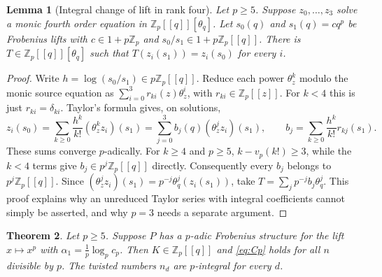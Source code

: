 \documentclass[11pt]{amsart}
\newtheorem{theorem}{Theorem}[section]
\newtheorem{lemma}[theorem]{Lemma}
\theoremstyle{definition}
\theoremstyle{remark}
\newcommand{\Z}{\mathbb{Z}}
\begin{document}
\begin{lemma}[Integral change of lift in rank four]\label{lem:transport}
Let $p\ge5$. Suppose $z_0,\ldots,z_3$ solve a monic fourth order equation in
$\Z_p[[q]][\theta_q]$. Let $s_0(q)$ and $s_1(q)=c q^p$ be Frobenius lifts with
$c\in1+p\Z_p$ and $s_0/s_1\in1+p\Z_p[[q]]$.
There is $T\in\Z_p[[q]][\theta_q]$ such that
$T(z_i(s_1))=z_i(s_0)$ for every $i$.
\end{lemma}
\begin{proof}
Write $h=\log(s_0/s_1)\in p\Z_p[[q]]$. Reduce each power $\theta_z^k$ modulo
the monic source equation as $\sum_{i=0}^3r_{ki}(z)\theta_z^i$, with
$r_{ki}\in\Z_p[[z]]$. For $k<4$ this is just $r_{ki}=\delta_{ki}$.
Taylor's formula gives, on solutions,
\[
z_i(s_0)=\sum_{k\ge0}\frac{h^k}{k!}(\theta_z^k z_i)(s_1)
=\sum_{j=0}^3b_j(q)(\theta_z^j z_i)(s_1),\qquad
b_j=\sum_{k\ge0}\frac{h^k}{k!}r_{kj}(s_1).
\]
These sums converge $p$-adically. For $k\ge4$ and $p\ge5$,
$k-v_p(k!)\ge3$, while the $k<4$ terms give $b_j\in p^j\Z_p[[q]]$ directly.
Consequently every $b_j$ belongs to $p^j\Z_p[[q]]$.
Since $(\theta_z^jz_i)(s_1)=p^{-j}\theta_q^j(z_i(s_1))$, take
$T=\sum_jp^{-j}b_j\theta_q^j$.
This proof explains why an unreduced Taylor series with integral coefficients
cannot simply be asserted, and why $p=3$ needs a separate argument.
\end{proof}

\begin{theorem}\label{thm:twisted}
Let $p\ge5$. Suppose $P$ has a $p$-adic Frobenius structure for the lift $x\mapsto x^p$
with $\alpha_1=\frac1p\log_p c_p$. Then $K\in\Z_p[[q]]$ and \eqref{eq:Cp} holds for all
$n$ divisible by $p$. The twisted numbers $n_d$ are $p$-integral for every $d$.
\end{theorem}
\end{document}
